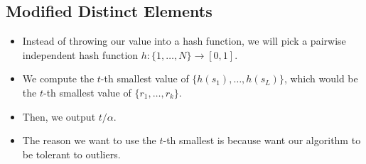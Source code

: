 \subsection{Modified Distinct Elements}
\begin{itemize}
	\item Instead of throwing our value into a hash function, we will pick a pairwise independent hash 
		function \( h: \{1, \dots, N\}  \to [0, 1] \). 
	\item We compute the \( t \)-th smallest value of \( \{h(s_1), \dots, h(s_L)\}  \), which would be 
		the \( t \)-th smallest value of \( \{r_1, \dots, r_k\}  \). 
	\item Then, we output \( t / \alpha \).
	\item The reason we want to use the \( t \)-th smallest is because want our algorithm to be tolerant to 
		outliers. 


\end{itemize}
